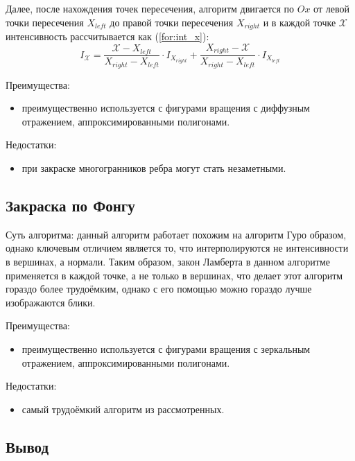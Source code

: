 Далее, после нахождения точек пересечения, алгоритм двигается по $Ox$ от левой точки пересечения $X_{left}$ до правой точки пересечения $X_{right}$ и в каждой точке $\mathcal{X}$ интенсивность рассчитывается как (\ref{for:int_x}):
\begin{equation}
    \label{for:int_x}
    I_{\mathcal{X}} = \frac{\mathcal{X} - X_{left}}{X_{right} - X_{left}} \cdot I_{X_{right}} + \frac{X_{right} - \mathcal{X}}{X_{right} - X_{left}} \cdot I_{X_{left}}
\end{equation}

Преимущества:
\begin{itemize}
    \item преимущественно используется с фигурами вращения с диффузным отражением, аппроксимированными полигонами.
\end{itemize}

Недостатки:
\begin{itemize}
    \item при закраске многогранников ребра могут стать незаметными.
\end{itemize}

\subsection{Закраска по Фонгу}
Суть алгоритма: данный алгоритм работает похожим на алгоритм Гуро образом, однако ключевым отличием является то, что интерполируются не интенсивности в вершинах, а нормали\cite{lmodels}. Таким образом, закон Ламберта в данном алгоритме применяется в каждой точке, а не только в вершинах, что делает этот алгоритм гораздо более трудоёмким, однако с его помощью можно гораздо лучше изображаются блики.

Преимущества:
\begin{itemize}
    \item преимущественно используется с фигурами вращения с зеркальным отражением, аппроксимированными полигонами.
\end{itemize}

Недостатки:
\begin{itemize}
    \item самый трудоёмкий алгоритм из рассмотренных\cite{rogers}.
\end{itemize}

\subsection*{Вывод}

